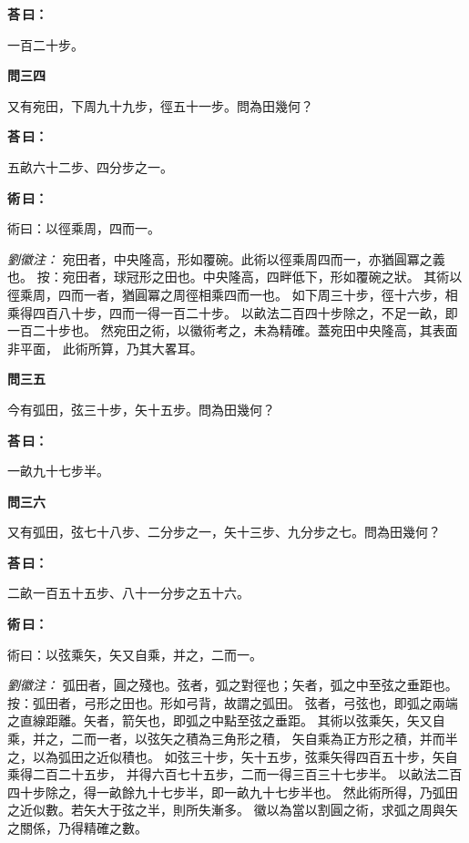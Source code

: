 \documentclass[11pt,a4paper]{article}
\newenvironment{problem}[1][]{%
  \par\vspace{0.6em}\noindent\textcolor{problemcolor}{\textbf{問\ignorespaces#1\unskip}\hspace{0.5em}}%
  \ignorespaces
}{\par\vspace{0.4em}}
\newenvironment{answer}{%
  \par\noindent\textcolor{answercolor}{\textbf{荅\,曰：}}%
  \ignorespaces
}{\par\vspace{0.3em}}
\newenvironment{method}{%
  \par\noindent\textcolor{methodcolor}{\textbf{術\,曰：}}%
  \ignorespaces
}{\par\vspace{0.4em}}
\newenvironment{liuhuicomm}{%
  \par\vspace{0.3em}\noindent\textcolor{commentarycolor}{\small\textit{劉徽注：}}}%
  {\par\vspace{0.5em}}
\begin{document}
\begin{answer}
一百二十步。
\end{answer}

\begin{problem}[三四]
又有宛田，下周九十九步，徑五十一步。問為田幾何？
\end{problem}

\begin{answer}
五畝六十二步、四分步之一。
\end{answer}

\begin{method}
術曰：以徑乘周，四而一。
\end{method}

\begin{liuhuicomm}
宛田者，中央隆高，形如覆碗。此術以徑乘周四而一，亦猶圓冪之義也。
按：宛田者，球冠形之田也。中央隆高，四畔低下，形如覆碗之狀。
其術以徑乘周，四而一者，猶圓冪之周徑相乘四而一也。
如下周三十步，徑十六步，相乘得四百八十步，四而一得一百二十步。
以畝法二百四十步除之，不足一畝，即一百二十步也。
然宛田之術，以徽術考之，未為精確。蓋宛田中央隆高，其表面非平面，
此術所算，乃其大畧耳。
\end{liuhuicomm}

\begin{problem}[三五]
今有弧田，弦三十步，矢十五步。問為田幾何？
\end{problem}

\begin{answer}
一畝九十七步半。
\end{answer}

\begin{problem}[三六]
又有弧田，弦七十八步、二分步之一，矢十三步、九分步之七。問為田幾何？
\end{problem}

\begin{answer}
二畝一百五十五步、八十一分步之五十六。
\end{answer}

\begin{method}
術曰：以弦乘矢，矢又自乘，并之，二而一。
\end{method}

\begin{liuhuicomm}
弧田者，圓之殘也。弦者，弧之對徑也；矢者，弧之中至弦之垂距也。
按：弧田者，弓形之田也。形如弓背，故謂之弧田。
弦者，弓弦也，即弧之兩端之直線距離。矢者，箭矢也，即弧之中點至弦之垂距。
其術以弦乘矢，矢又自乘，并之，二而一者，以弦矢之積為三角形之積，
矢自乘為正方形之積，并而半之，以為弧田之近似積也。
如弦三十步，矢十五步，弦乘矢得四百五十步，矢自乘得二百二十五步，
并得六百七十五步，二而一得三百三十七步半。
以畝法二百四十步除之，得一畝餘九十七步半，即一畝九十七步半也。
然此術所得，乃弧田之近似數。若矢大于弦之半，則所失漸多。
徽以為當以割圓之術，求弧之周與矢之關係，乃得精確之數。
\end{liuhuicomm}
\end{document}
